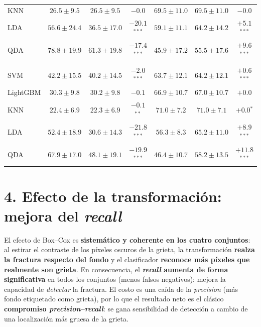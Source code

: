 \documentclass[11pt]{article}
\begin{document}
\begin{table}[H]
\begin{tabular}{l ccc ccc}
\quad KNN & $26.5\pm9.5$ & $26.5\pm9.5$ & $-0.0$ & $69.5\pm11.0$ & $69.5\pm11.0$ & $-0.0$ \\
\quad LDA & $56.6\pm24.4$ & $36.5\pm17.0$ & $-20.1$$^{***}$ & $59.1\pm11.1$ & $64.2\pm14.2$ & $+5.1$$^{***}$ \\
\quad QDA & $78.8\pm19.9$ & $61.3\pm19.8$ & $-17.4$$^{***}$ & $45.9\pm17.2$ & $55.5\pm17.6$ & $+9.6$$^{***}$ \\
\addlinespace
\multicolumn{7}{l}{\textit{Grandes} ($\bar\lambda=2.38$)} \\
\quad SVM & $42.2\pm15.5$ & $40.2\pm14.5$ & $-2.0$$^{***}$ & $63.7\pm12.1$ & $64.2\pm12.1$ & $+0.6$$^{***}$ \\
\quad LightGBM & $30.3\pm9.8$ & $30.2\pm9.8$ & $-0.1$ & $66.9\pm10.7$ & $67.0\pm10.7$ & $+0.0$ \\
\quad KNN & $22.4\pm6.9$ & $22.3\pm6.9$ & $-0.1$$^{**}$ & $71.0\pm7.2$ & $71.0\pm7.1$ & $+0.0$$^{*}$ \\
\quad LDA & $52.4\pm18.9$ & $30.6\pm14.3$ & $-21.8$$^{***}$ & $56.3\pm8.3$ & $65.2\pm11.0$ & $+8.9$$^{***}$ \\
\quad QDA & $67.9\pm17.0$ & $48.1\pm19.1$ & $-19.9$$^{***}$ & $46.4\pm10.7$ & $58.2\pm13.5$ & $+11.8$$^{***}$ \\
\bottomrule
\end{tabular}
\end{table}

\section*{4. Efecto de la transformaci\'on: mejora del \emph{recall}}
El efecto de Box--Cox es \textbf{sistem\'atico y coherente en los cuatro conjuntos}: al estirar
el contraste de los p\'ixeles oscuros de la grieta, la transformaci\'on \textbf{realza la
fractura respecto del fondo} y el clasificador \textbf{reconoce m\'as p\'ixeles que realmente
son grieta}. En consecuencia, el \textbf{\emph{recall} aumenta de forma significativa} en todos
los conjuntos (menos falsos negativos): mejora la capacidad de \emph{detectar} la fractura. El
costo es una ca\'ida de la \emph{precision} (m\'as fondo etiquetado como grieta), por lo que el
resultado neto es el cl\'asico \textbf{compromiso \emph{precision}--\emph{recall}}: se gana
sensibilidad de detecci\'on a cambio de una localizaci\'on m\'as gruesa de la grieta.
\end{document}
